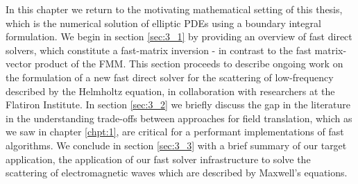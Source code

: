 In this chapter we return to the motivating mathematical setting of this thesis, which is the numerical solution of elliptic PDEs using a boundary integral formulation. We begin in section \ref{sec:3_1} by providing an overview of fast direct solvers, which constitute a fast-matrix inversion - in contrast to the fast matrix-vector product of the FMM. This section proceeds to describe ongoing work on the formulation of a new fast direct solver for the scattering of low-frequency described by the Helmholtz equation, in collaboration with researchers at the Flatiron Institute. In section \ref{sec:3_2} we briefly discuss the gap in the literature in the understanding trade-offs between approaches for field translation, which as we saw in chapter \ref{chpt:1}, are critical for a performant implementations of fast algorithms. We conclude in section \ref{sec:3_3} with a brief summary of our target application, the application of our fast solver infrastructure to solve the scattering of electromagnetic waves which are described by Maxwell's equations.

